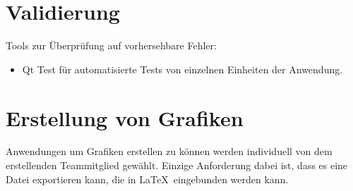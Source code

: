 \section{Validierung}
	Tools zur Überprüfung auf vorhersehbare Fehler:
	\begin{itemize}
		\item Qt Test für automatisierte Tests von einzelnen Einheiten der Anwendung.
	\end{itemize}
\section{Erstellung von Grafiken}
	Anwendungen um Grafiken erstellen zu können werden individuell von dem erstellenden Teammitglied gewählt. Einzige Anforderung dabei ist, dass es eine Datei exportieren kann, die in \LaTeX\ eingebunden werden kann.
